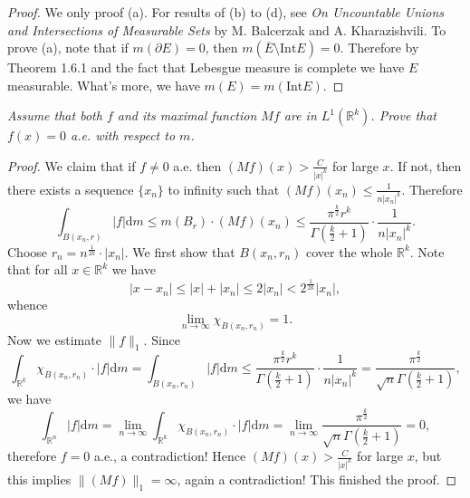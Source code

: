 \begin{proof}
We only proof (a). For results of (b) to (d), see \textit{On Uncountable Unions and Intersections of Measurable Sets} by M. Balcerzak and A. Kharazishvili. To prove (a), note that if $m(\partial E)=0$, then $m\left( \overline{E}\setminus \mathrm{Int}E \right) =0$. Therefore by Theorem 1.6.1 and the fact that Lebesgue measure is complete we have $E$ measurable. What's more, we have $m(E)=m(\mathrm{Int}E)$.
\end{proof}
\begin{problem}\em
Assume that both $f$ and its maximal function $Mf$ are in $L^1(\mathbb{R}^k)$. Prove that $f(x)=0$ a.e. with respect to $m$.\par
\end{problem}
\begin{proof}
We claim that if $f\ne 0$ a.e. then $\left( Mf \right) \left( x \right) >\frac{C}{\left| x \right|^k}$ for large $x$. If not, then there exists a sequence $\{x_n\}$ to infinity such that $\left( Mf \right) \left( x_n \right) \le \frac{1}{n\left| x_n \right|^k}$. Therefore 
$$
\int_{B\left( x_n,r \right)}{\left| f \right|\mathrm{d}m}\le m\left( B_r \right) \cdot \left( Mf \right) \left( x_n \right) \le \frac{\pi ^{\frac{k}{2}}r^k}{\Gamma \left( \frac{k}{2}+1 \right)}\cdot \frac{1}{n\left| x_n \right|^k}.
$$
Choose $r_n=n^{\frac{1}{2k}}\cdot|x_n|$. We first show that $B(x_n,r_n)$ cover the whole $\mathbb{R}^k$. Note that for all $x\in\mathbb{R}^k$ we have 
$$
\left| x-x_n \right|\le \left| x \right|+\left| x_n \right|\le 2\left| x_n \right|<2^{\frac{1}{2k}}\left| x_n \right|,
$$
whence 
$$
\lim_{n\rightarrow \infty} \chi _{B\left( x_n,r_n \right)}=1.
$$
Now we estimate $\|f\|_1$. Since 
$$
\int_{\mathbb{R} ^k}{\chi _{B\left( x_n,r_n \right)}\cdot \left| f \right|\mathrm{d}m}=\int_{B\left( x_n,r_n \right)}{\left| f \right|\mathrm{d}m}\le \frac{\pi ^{\frac{k}{2}}r^k}{\Gamma \left( \frac{k}{2}+1 \right)}\cdot \frac{1}{n\left| x_n \right|^k}=\frac{\pi ^{\frac{k}{2}}}{\sqrt{n}\Gamma \left( \frac{k}{2}+1 \right)},
$$
we have 
$$
\int_{\mathbb{R} ^n}{\left| f \right|\mathrm{d}m}=\lim_{n\rightarrow \infty} \int_{\mathbb{R} ^k}{\chi _{B\left( x_n,r_n \right)}\cdot \left| f \right|\mathrm{d}m}=\lim_{n\rightarrow \infty} \frac{\pi ^{\frac{k}{2}}}{\sqrt{n}\Gamma \left( \frac{k}{2}+1 \right)}=0,
$$
therefore $f=0$ a.e., a contradiction! Hence $\left( Mf \right) \left( x \right) >\frac{C}{\left| x \right|^k}$ for large $x$, but this implies $\|(Mf)\|_1=\infty$, again a contradiction! This finished the proof.
\end{proof}
